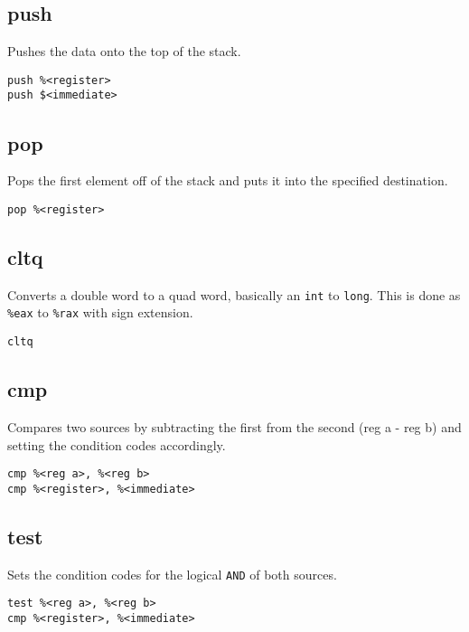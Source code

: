 \documentclass[reqno,a4paper,11pt]{amsart}
\begin{document}
\subsection{push}
Pushes the data onto the top of the stack.
\begin{lstlisting}
push %<register>
push $<immediate>
\end{lstlisting}
\subsection{pop}
Pops the first element off of the stack and puts it into the specified
destination.
\begin{lstlisting}
pop %<register>
\end{lstlisting}
\subsection{cltq}
Converts a double word to a quad word, basically an \texttt{int} to
\texttt{long}. This is done as \texttt{\%eax} to \texttt{\%rax} with sign
extension.
\begin{lstlisting}
cltq
\end{lstlisting}
\subsection{cmp}
Compares two sources by subtracting the first from the second (reg a - reg b)
and setting the condition codes accordingly.
\begin{lstlisting}
cmp %<reg a>, %<reg b>
cmp %<register>, %<immediate>
\end{lstlisting}
\subsection{test}
Sets the condition codes for the logical \texttt{AND} of both sources.
\begin{lstlisting}
test %<reg a>, %<reg b>
cmp %<register>, %<immediate>
\end{lstlisting}
\end{document}
